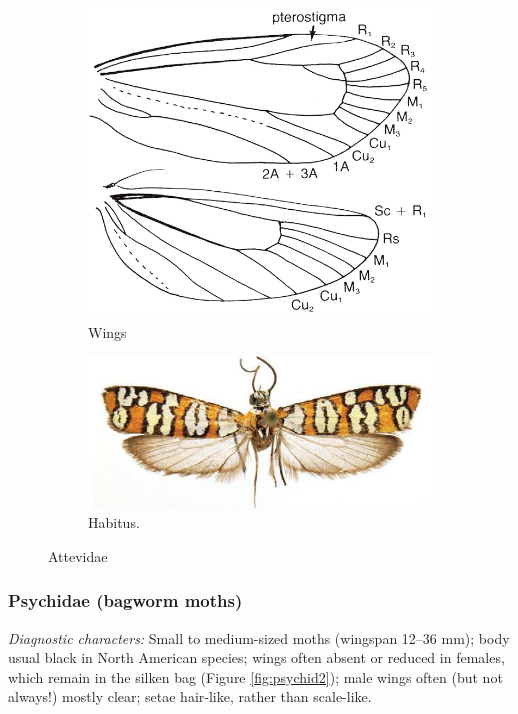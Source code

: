 \documentclass[letterpaper, 11pt]{article}
\begin{document}
\begin{figure}[ht!]
    \centering
    \begin{subfigure}[ht!]{0.36\textwidth}
        \includegraphics[width=\textwidth]{image40}
        \caption{Wings}
        \label{fig:attev1}
    \end{subfigure}
    \qquad %
    \begin{subfigure}[ht!]{0.45\textwidth}
        \includegraphics[width=\textwidth]{ypono}
        \caption{Habitus. \citep[Photo CC BY 3.0 by ][]{wilsonetal2010}}
        \label{fig:attev2}
    \end{subfigure}
    \caption{Attevidae}\label{fig:attevids}
\end{figure}

\subsubsection{Psychidae (bagworm moths)}
\noindent{}\textit{Diagnostic characters:} Small to medium-sized moths (wingspan 12--36 mm); body usual black in North American species; wings often absent or reduced in females, which remain in the silken bag (Figure \ref{fig:psychid2}); male wings often (but not always!) mostly clear; setae hair-like, rather than scale-like.\\
\end{document}
